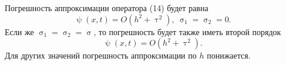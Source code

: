\documentclass[a4paper, 12pt]{report}
\numberwithin{equation}{section}
\renewcommand{\tau}{\uptau}
\renewcommand{\sigma}{\upsigma}
\renewcommand{\psi}{\uppsi}
\begin{document}
		Погрешность аппроксимации оператора (14) будет равна $$\psi(x,t) = O(h^2 + \tau^2),\ \sigma_1=\sigma_2 = 0.$$
		Если же $\sigma_1 = \sigma_2 = \sigma$, то погрешность будет также иметь второй порядок
		$$\psi(x,t) = O(h^2 + \tau^2).$$
		Для других значений погрешность аппроксимации по $h$ понижается.
	
\end{document}
